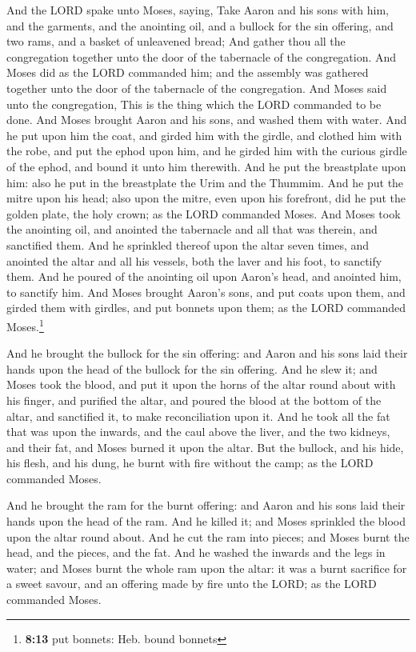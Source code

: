  And the LORD spake unto Moses, saying, 
Take Aaron and his sons with him, and the garments, and the anointing
oil, and a bullock for the sin offering, and two rams, and a basket of
unleavened bread;  And gather thou all the congregation
together unto the door of the tabernacle of the congregation.
 And Moses did as the LORD commanded him; and the assembly
was gathered together unto the door of the tabernacle of the
congregation.  And Moses said unto the congregation, This
is the thing which the LORD commanded to be done.  And
Moses brought Aaron and his sons, and washed them with water.
 And he put upon him the coat, and girded him with the
girdle, and clothed him with the robe, and put the ephod upon him, and
he girded him with the curious girdle of the ephod, and bound it unto
him therewith.  And he put the breastplate upon him: also
he put in the breastplate the Urim and the Thummim.  And
he put the mitre upon his head; also upon the mitre, even upon his
forefront, did he put the golden plate, the holy crown; as the LORD
commanded Moses.  And Moses took the anointing oil, and
anointed the tabernacle and all that was therein, and sanctified them.
 And he sprinkled thereof upon the altar seven times, and
anointed the altar and all his vessels, both the laver and his foot, to
sanctify them.  And he poured of the anointing oil upon
Aaron's head, and anointed him, to sanctify him.  And
Moses brought Aaron's sons, and put coats upon them, and girded them
with girdles, and put bonnets upon them; as the LORD commanded
Moses.\footnote{\textbf{8:13} put bonnets: Heb. bound bonnets}

 And he brought the bullock for the sin offering: and
Aaron and his sons laid their hands upon the head of the bullock for the
sin offering.  And he slew it; and Moses took the blood,
and put it upon the horns of the altar round about with his finger, and
purified the altar, and poured the blood at the bottom of the altar, and
sanctified it, to make reconciliation upon it.  And he
took all the fat that was upon the inwards, and the caul above the
liver, and the two kidneys, and their fat, and Moses burned it upon the
altar.  But the bullock, and his hide, his flesh, and his
dung, he burnt with fire without the camp; as the LORD commanded Moses.

 And he brought the ram for the burnt offering: and Aaron
and his sons laid their hands upon the head of the ram. 
And he killed it; and Moses sprinkled the blood upon the altar round
about.  And he cut the ram into pieces; and Moses burnt
the head, and the pieces, and the fat.  And he washed the
inwards and the legs in water; and Moses burnt the whole ram upon the
altar: it was a burnt sacrifice for a sweet savour, and an offering made
by fire unto the LORD; as the LORD commanded Moses.

